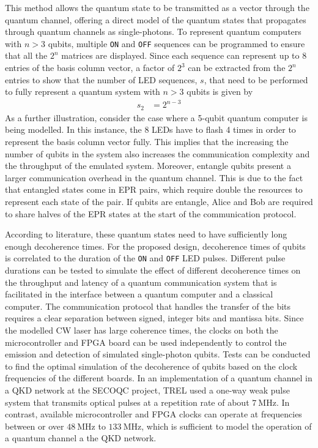 This method allows the quantum state to be transmitted as a vector through the quantum channel, offering a direct model of the quantum states that propagates through quantum channels as single-photons. To represent quantum computers with $n > 3$ qubits, multiple \texttt{ON} and \texttt{OFF} sequences can be programmed to ensure that all the $2^n$ matrices are displayed. Since each sequence can represent up to $8$ entries of the basis column vector, a factor of $2^3$ can be extracted from the $2^n$ entries to show that the number of LED sequences, $s$, that need to be performed to fully represent a quantum system with $n>3$ qubits is given by
\begin{align}\label{eqn:led-repetitions}
	s_2 & = 2^{n-3}
\end{align}
As a further illustration, consider the case where a 5-qubit quantum computer is being modelled. In this instance, the 8 LEDs have to flash 4 times in order to represent the basis column vector fully. This implies that the increasing the number of qubits in the system also increases the communication complexity and the throughput of the emulated system. Moreover, entangle qubits present a larger communication overhead in the quantum channel. This is due to the fact that entangled states come in EPR pairs, which require double the resources to represent each state of the pair. If qubits are entangle, Alice and Bob are required to share halves of the EPR states at the start of the communication protocol.

According to literature, these quantum states need to have sufficiently long enough decoherence times. For the proposed design, decoherence times of qubits is correlated to the duration of the \texttt{ON} and \texttt{OFF} LED pulses. Different pulse durations can be tested to simulate the effect of different decoherence times on the throughput and latency of a quantum communication system that is facilitated in the interface between a quantum computer and a classical computer. The communication protocol that handles the transfer of the bits requires a clear separation between signed, integer bits and mantissa bits. Since the modelled CW laser has large coherence times, the clocks on both the microcontroller and FPGA board can be used independently to control the emission and detection of simulated single-photon qubits. Tests can be conducted to find the optimal simulation of the decoherence of qubits based on the clock frequencies of the different boards. In an implementation of a quantum channel in a QKD network at the SECOQC project, TREL used a one-way weak pulse system that transmits optical pulses at a repetition rate of about $\SI{7}{\mega\hertz}$. In contrast, available microcontroller and FPGA clocks can operate at frequencies between or over $\SI{48}{\mega\hertz}$ to $\SI{133}{\mega\hertz}$, which is sufficient to model the operation of a quantum channel a the QKD network. 

